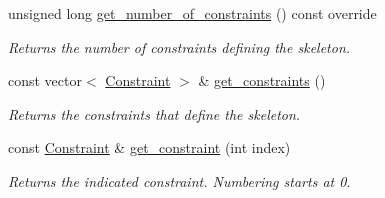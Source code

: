 \begin{Indent}
\begin{DoxyCompactItemize}
\mbox{\label{group___c_l_s_solvers_ac13c3eb80cc3a4fdee872c4c976da489}} 
unsigned long \hyperlink{group___c_l_s_solvers_ac13c3eb80cc3a4fdee872c4c976da489}{get\+\_\+number\+\_\+of\+\_\+constraints} () const override
\begin{DoxyCompactList}\small\item\em Returns the number of constraints defining the skeleton. \end{DoxyCompactList}\item 
\mbox{\label{group___c_l_s_solvers_a7e1d8c1c056b9ec770f0c9abacdabe5d}} 
const vector$<$ \hyperlink{group___c_l_s_solvers_class_l_p___solvers_1_1_constraint}{Constraint} $>$ \& \hyperlink{group___c_l_s_solvers_a7e1d8c1c056b9ec770f0c9abacdabe5d}{get\+\_\+constraints} ()
\begin{DoxyCompactList}\small\item\em Returns the constraints that define the skeleton. \end{DoxyCompactList}\item 
\mbox{\label{group___c_l_s_solvers_abbc8543d03ed7464149e6dba20f77da1}} 
const \hyperlink{group___c_l_s_solvers_class_l_p___solvers_1_1_constraint}{Constraint} \& \hyperlink{group___c_l_s_solvers_abbc8543d03ed7464149e6dba20f77da1}{get\+\_\+constraint} (int index)
\begin{DoxyCompactList}\small\item\em Returns the indicated constraint. Numbering starts at 0. \end{DoxyCompactList}\end{DoxyCompactItemize}
\end{Indent}
